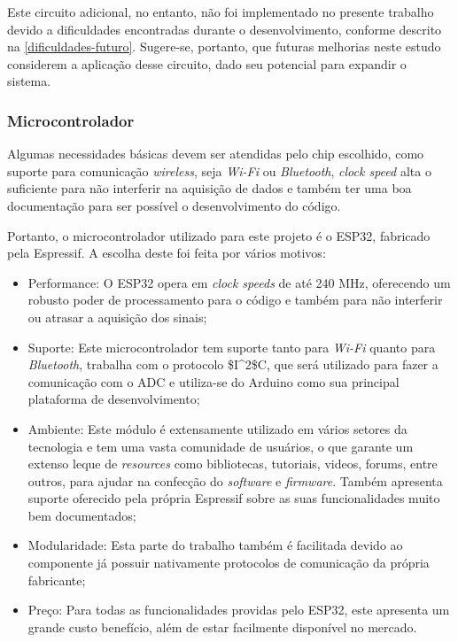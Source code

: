 Este circuito adicional, no entanto, não foi implementado no presente trabalho devido a dificuldades encontradas durante o desenvolvimento, conforme descrito na \autoref{dificuldades-futuro}. Sugere-se, portanto, que futuras melhorias neste estudo considerem a aplicação desse circuito, dado seu potencial para expandir o sistema.

\subsubsection{Microcontrolador}\label{uC-metodologia}

Algumas necessidades básicas devem ser atendidas pelo chip escolhido, como suporte para comunicação \textit{wireless}, seja \textit{Wi-Fi} ou \textit{Bluetooth}, \textit{clock speed} alta o suficiente para não interferir na aquisição de dados e também ter uma boa documentação para ser possível o desenvolvimento do código.

Portanto, o microcontrolador utilizado para este projeto é o ESP32, fabricado pela Espressif. A escolha deste foi feita por vários motivos:

\begin{itemize}
    \item Performance: O ESP32 opera em \textit{clock speeds} de até 240 MHz, oferecendo um robusto poder de processamento para o código e também para não interferir ou atrasar a aquisição dos sinais;
    \item Suporte: Este microcontrolador tem suporte tanto para \textit{Wi-Fi} quanto para \textit{Bluetooth}, trabalha com o protocolo \gls{$I^2$C}, que será utilizado para fazer a comunicação com o \gls{ADC} e utiliza-se do Arduino como sua principal plataforma de desenvolvimento;
    \item Ambiente: Este módulo é extensamente utilizado em vários setores da tecnologia e tem uma vasta comunidade de usuários, o que garante um extenso leque de \textit{resources} como bibliotecas, tutoriais, videos, forums, entre outros, para ajudar na confecção do \textit{software} e \textit{firmware}. Também apresenta suporte oferecido pela própria Espressif sobre as suas funcionalidades muito bem documentados;
    \item Modularidade: Esta parte do trabalho também é facilitada devido ao componente já possuir nativamente protocolos de comunicação da própria fabricante;
    \item Preço: Para todas as funcionalidades providas pelo ESP32, este apresenta um grande custo benefício, além de estar facilmente disponível no mercado.
\end{itemize}

